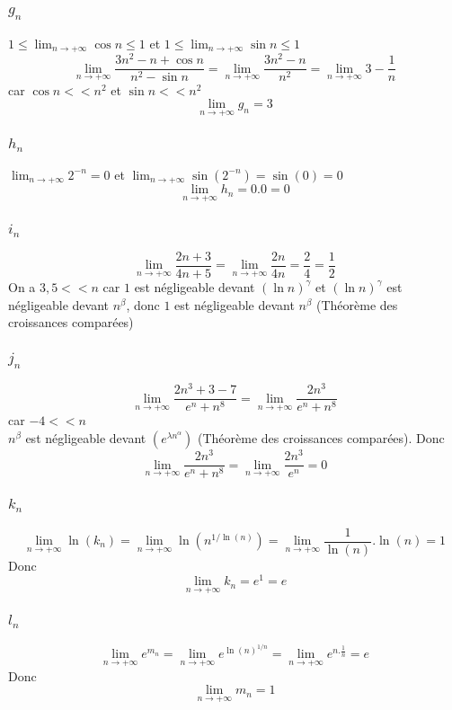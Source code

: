 \documentclass[]{book}
\theoremstyle{definition}
\begin{document}
\subsubsection*{$g_n$}
$1 \leq \lim_{n \to +\infty}{\cos n} \leq 1$ et $1 \leq \lim_{n \to +\infty}{\sin n} \leq 1$
$$\lim_{n \to +\infty}{\frac{3n^2-n+\cos n}{n^2 - \sin n}} = \lim_{n \to +\infty}{\frac{3n^2-n}{n^2}} = \lim_{n \to +\infty}{3-\frac{1}{n}}$$
car $\cos n << n^2$ et $\sin n << n^2$
$$\lim_{n \to +\infty}{g_n} = 3 $$

\subsubsection*{$h_n$}
$\lim_{n \to +\infty}{2^{-n}} = 0$ et $\lim_{n \to +\infty}{\sin(2^{-n})} = \sin(0) = 0$
$$\lim_{n \to +\infty}{h_n} = 0.0 =0$$

\subsubsection*{$i_n$}
$$\lim_{n \to +\infty}{\frac{2n+3}{4n+5}} = \lim_{n \to +\infty}{\frac{2n}{4n}} = \frac{2}{4} = \frac{1}{2}$$
On a $3,5 << n$ car $1$ est n\'egligeable devant $(\ln n)^{\gamma}$ et $(\ln n)^{\gamma}$ est n\'egligeable devant $n^{\beta}$, donc $1$ est n\'egligeable devant $n^{\beta}$ (Th\'eor\`eme des croissances compar\'ees)

\subsubsection*{$j_n$}
$$\lim_{n \to +\infty}{\frac{2n^3+3-7}{e^n+n^8}} = \lim_{n \to +\infty}{\frac{2n^3}{e^n+n^8}}$$
car $-4 << n$\\
$n^{\beta}$ est n\'egligeable devant $(e^{\lambda n^{\alpha}})$ (Th\'eor\`eme des croissances compar\'ees). Donc
$$\lim_{n \to +\infty}{\frac{2n^3}{e^n+n^8}} = \lim_{n \to +\infty}{\frac{2n^3}{e^n}} = 0$$

\subsubsection*{$k_n$}
$$\lim_{n \to +\infty}{\ln(k_n)} = \lim_{n \to +\infty}{\ln(n^{1/\ln(n)})} = \lim_{n \to +\infty}{\frac{1}{\ln(n)}.\ln(n)} = 1$$
Donc
$$\lim_{n \to +\infty}{k_n} = e^1 = e$$

\subsubsection*{$l_n$}
$$\lim_{n \to +\infty}{e^{m_n}} = \lim_{n \to +\infty}{e^{\ln(n)^{1/n}}} = \lim_{n \to +\infty}{e^{n.\frac{1}{n}}} = e$$
Donc
$$\lim_{n \to +\infty}{m_n} = 1$$
\end{document}
